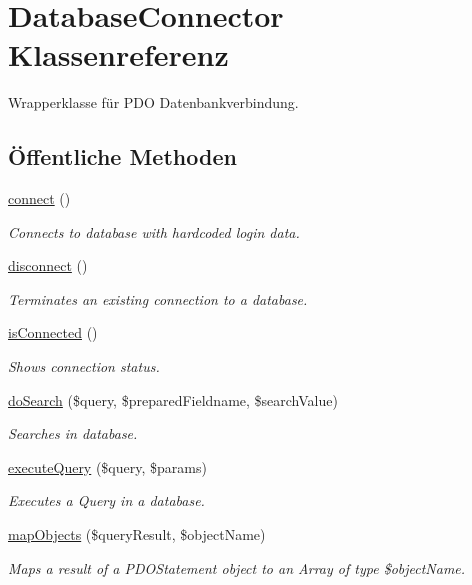 \hypertarget{classDatabaseConnector}{\section{\-Database\-Connector \-Klassenreferenz}
\label{classDatabaseConnector}
}


\-Wrapperklasse für \-P\-D\-O \-Datenbankverbindung.  


\subsection*{Öffentliche \-Methoden}
\begin{DoxyCompactItemize}
\item 
\hyperlink{classDatabaseConnector_a35b5a0c202be58fb17af638611fb4dc9}{connect} ()
\begin{DoxyCompactList}\small\item\em \-Connects to database with hardcoded login data. \end{DoxyCompactList}\item 
\hyperlink{classDatabaseConnector_a7adf5547e1312d72b3644aa69986a743}{disconnect} ()
\begin{DoxyCompactList}\small\item\em \-Terminates an existing connection to a database. \end{DoxyCompactList}\item 
\hyperlink{classDatabaseConnector_a30417e69e7374ecb284861dc304624bd}{is\-Connected} ()
\begin{DoxyCompactList}\small\item\em \-Shows connection status. \end{DoxyCompactList}\item 
\hyperlink{classDatabaseConnector_a0e2aee996d3606ab10fcce9d64341d9c}{do\-Search} (\$query, \$prepared\-Fieldname, \$search\-Value)
\begin{DoxyCompactList}\small\item\em \-Searches in database. \end{DoxyCompactList}\item 
\hyperlink{classDatabaseConnector_a3c9e52fd01af60e5131a9b2d97686519}{execute\-Query} (\$query, \$params)
\begin{DoxyCompactList}\small\item\em \-Executes a \-Query in a database. \end{DoxyCompactList}\item 
\hyperlink{classDatabaseConnector_a6952aca4ae6a237b347f2d66e439749c}{map\-Objects} (\$query\-Result, \$object\-Name)
\begin{DoxyCompactList}\small\item\em \-Maps a result of a \-P\-D\-O\-Statement object to an \-Array of type \$object\-Name. \end{DoxyCompactList}\end{DoxyCompactItemize}
